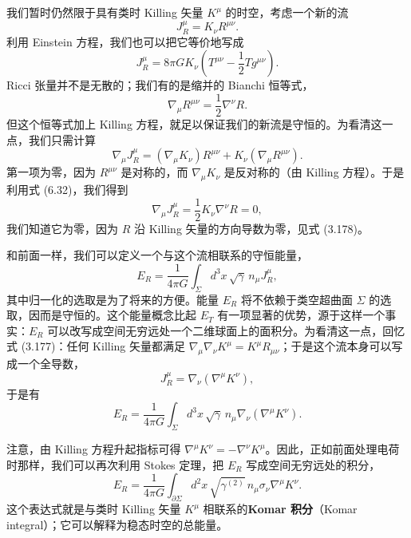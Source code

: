 我们暂时仍然限于具有类时 Killing 矢量 $K^{\mu}$ 的时空，考虑一个新的流
\begin{equation*}
J^{\mu}_{R} = K_\nu R^{\mu\nu}.
\tag{6.30}
\end{equation*}
利用 Einstein 方程，我们也可以把它等价地写成
\begin{equation*}
J^{\mu}_{R} = 8\pi G K_\nu\left(T^{\mu\nu}-\frac{1}{2}T g^{\mu\nu}\right).
\tag{6.31}
\end{equation*}
Ricci 张量并不是无散的；我们有的是缩并的 Bianchi 恒等式，
\begin{equation*}
\nabla_\mu R^{\mu\nu} = \frac{1}{2}\nabla^{\nu}R.
\tag{6.32}
\end{equation*}
但这个恒等式加上 Killing 方程，就足以保证我们的新流是守恒的。为看清这一点，我们只需计算
\begin{equation*}
\nabla_\mu J^{\mu}_{R} = (\nabla_\mu K_\nu)R^{\mu\nu} + K_\nu(\nabla_\mu R^{\mu\nu}).
\tag{6.33}
\end{equation*}
第一项为零，因为 $R^{\mu\nu}$ 是对称的，而 $\nabla_\mu K_\nu$ 是反对称的（由 Killing 方程）。于是利用式 (6.32)，我们得到
\begin{equation*}
\nabla_\mu J^{\mu}_{R} = \frac{1}{2}K_\nu\nabla^{\nu}R = 0,
\tag{6.34}
\end{equation*}
我们知道它为零，因为 $R$ 沿 Killing 矢量的方向导数为零，见式 (3.178)。

和前面一样，我们可以定义一个与这个流相联系的守恒能量，
\begin{equation*}
E_{R} = \frac{1}{4\pi G}\int_{\Sigma} d^{3}x\,\sqrt{\gamma}\, n_\mu J^{\mu}_{R},
\tag{6.35}
\end{equation*}
其中归一化的选取是为了将来的方便。能量 $E_{R}$ 将不依赖于类空超曲面 $\Sigma$ 的选取，因而是守恒的。这个能量概念比起 $E_{T}$ 有一项显著的优势，源于这样一个事实：$E_{R}$ 可以改写成空间无穷远处一个二维球面上的面积分。为看清这一点，回忆式 (3.177)：任何 Killing 矢量都满足 $\nabla_\mu\nabla_\nu K^{\mu}=K^{\mu}R_{\mu\nu}$；于是这个流本身可以写成一个全导数，
\begin{equation*}
J^{\mu}_{R} = \nabla_\nu(\nabla^{\mu}K^{\nu}),
\tag{6.36}
\end{equation*}
 于是有
\begin{equation*}
E_{R} = \frac{1}{4\pi G}\int_{\Sigma} d^{3}x\,\sqrt{\gamma}\, n_{\mu}\nabla_{\nu}\left(\nabla^{\mu}K^{\nu}\right).
\tag{6.37}
\end{equation*}

注意，由 Killing 方程升起指标可得 $\nabla^{\mu}K^{\nu}=-\nabla^{\nu}K^{\mu}$。因此，正如前面处理电荷时那样，我们可以再次利用 Stokes 定理，把 $E_{R}$ 写成空间无穷远处的积分，
\begin{equation*}
\boxed{\,E_{R} = \frac{1}{4\pi G}\int_{\partial\Sigma} d^{2}x\,\sqrt{\gamma^{(2)}}\, n_{\mu}\sigma_{\nu}\nabla^{\mu}K^{\nu}.\,}
\tag{6.38}
\end{equation*}
这个表达式就是与类时 Killing 矢量 $K^{\mu}$ 相联系的\textbf{Komar 积分}（Komar integral）；它可以解释为稳态时空的总能量。

